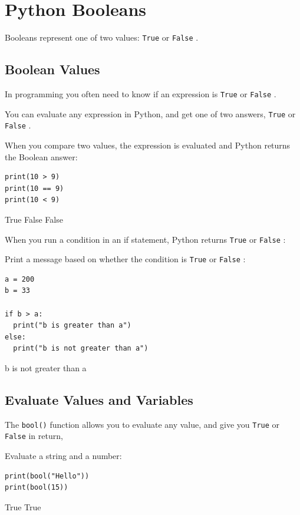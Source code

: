 \documentclass[12pt,a4paper]{article}
\newcommand{\code}[1]{%
	\colorbox{backcolour}{\lstinline{#1}}%
}
\begin{document}
\section{Python Booleans}
Booleans represent one of two values: \code{True} or \code{False}.

\subsection{Boolean Values}

In programming you often need to know if an expression is \code{True} or
\code{False}.

You can evaluate any expression in Python, and get one of two answers,
\code{True} or \code{False}.

When you compare two values, the expression is evaluated and Python returns the
Boolean answer:

\begin{ebox}
	\begin{lstlisting}
print(10 > 9)
print(10 == 9)
print(10 < 9)
	\end{lstlisting}
\tcblower
	\begin{vercode}
True
False
False
	\end{vercode}
\end{ebox}

When you run a condition in an if statement, Python returns \code{True} or
\code{False}:

\begin{ebox}
	Print a message based on whether the condition is \code{True} or
	\code{False}:
	\begin{lstlisting}
a = 200
b = 33

if b > a:
  print("b is greater than a")
else:
  print("b is not greater than a")
	\end{lstlisting}
\tcblower
	\begin{vercode}
b is not greater than a
	\end{vercode}
\end{ebox}
\subsection{Evaluate Values and Variables}
The \code{bool()} function allows you to evaluate any value, and give you \code{True} or \code{False} in return,

\begin{ebox}
Evaluate a string and a number:
	\begin{lstlisting}
print(bool("Hello"))
print(bool(15))
	\end{lstlisting}
\tcblower
	\begin{vercode}
True
True
	\end{vercode}
\end{ebox}
\end{document}
